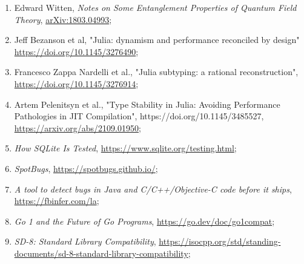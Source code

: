 \documentclass[a4paper,11pt]{article}
\begin{document}
\begin{enumerate}

\item Edward Witten, \textit{Notes on Some Entanglement Properties of
    Quantum Field Theory},
  \href{https://arxiv.org/abs/1803.04993}{arXiv:1803.04993};



\item Jeff Bezanson et al, "Julia: dynamism and performance reconciled
  by design"
  \href{https://doi.org/10.1145/3276490}{https://doi.org/10.1145/3276490};



\item Francesco Zappa Nardelli et al., "Julia subtyping: a rational
  reconstruction",
  \href{https://doi.org/10.1145/3276914}{https://doi.org/10.1145/3276914};



\item Artem Pelenitsyn et al., "Type Stability in Julia: Avoiding
  Performance Pathologies in JIT Compilation",
  https://doi.org/10.1145/3485527,
  \href{arXiv:2109.01950}{https://arxiv.org/abs/2109.01950};



\item \textit{How SQLite Is Tested},
  \href{https://www.sqlite.org/testing.html}{https://www.sqlite.org/testing.html};



\item \textit{SpotBugs},
  \href{https://spotbugs.github.io/}{https://spotbugs.github.io/};



\item \textit{A tool to detect bugs in Java and C/C++/Objective-C code
    before it ships},
  \href{https://fbinfer.com/}{https://fbinfer.com/la};



\item \textit{Go 1 and the Future of Go Programs},
  \href{https://go.dev/doc/go1compat}{https://go.dev/doc/go1compat};



\item \textit{SD-8: Standard Library Compatibility},
  \href{https://isocpp.org/std/standing-documents/sd-8-standard-library-compatibility}{https://isocpp.org/std/standing-documents/sd-8-standard-library-compatibility};




\end{enumerate}
\end{document}
